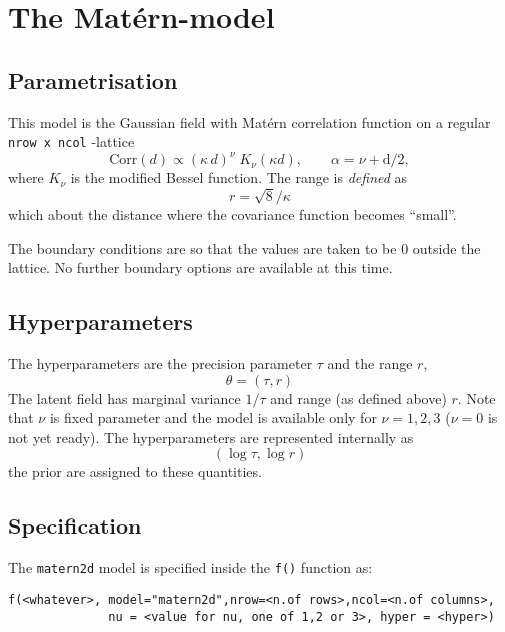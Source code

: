 \documentclass[a4paper,11pt]{article}
\begin{document}


\section*{The Mat\'ern-model}
\subsection*{Parametrisation}

This model is the Gaussian field with Mat\'ern correlation function on
a regular \verb|nrow x ncol| -lattice
\begin{displaymath}
    \text{Corr}(d)
    \propto
    \left(\kappa\, {d}\right)^{\nu}
    \;
    K_{\nu}( \kappa d), \qquad \alpha = \nu + \text{d}/2,
\end{displaymath}
where $K_{\nu}$ is the modified Bessel function. The range is
\emph{defined} as
\begin{displaymath}
    r = {\sqrt{8}}/{\kappa}
\end{displaymath}
which about the distance where the covariance function becomes
``small''.

The boundary conditions are so that the values are taken to be $0$
outside the lattice. No further boundary options are available at this
time.

\subsection*{Hyperparameters}

The hyperparameters are the precision parameter $\tau$ and the range
$r$,
\begin{displaymath}
    \theta = (\tau, r)
\end{displaymath}
The latent field has marginal variance $1/\tau$ and range (as defined
above) $r$. Note that $\nu$ is fixed parameter and the model is
available only for $\nu=1,2,3$ ($\nu=0$ is not yet ready).  The
hyperparameters are represented internally as
\begin{displaymath}
    (\log\tau, \log r)
\end{displaymath}
the prior are assigned to these quantities.

\subsection*{Specification}

The {\tt matern2d} model is specified inside the {\tt f()} function as:
\begin{verbatim}
f(<whatever>, model="matern2d",nrow=<n.of rows>,ncol=<n.of columns>,
              nu = <value for nu, one of 1,2 or 3>, hyper = <hyper>)
\end{verbatim}
\end{document}
